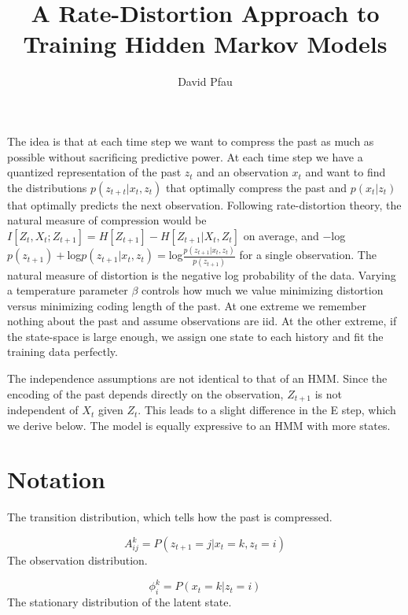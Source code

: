 \documentclass[11pt]{article}
\title{A Rate-Distortion Approach to Training Hidden Markov Models}
\author{David Pfau}
\begin{document}
\maketitle

The idea is that at each time step we want to compress the past as much as possible without sacrificing predictive power.  At each time step we have a quantized representation of the past $z_t$ and an observation $x_t$ and want to find the distributions $p(z_{t+t}|x_t,z_t)$ that optimally compress the past and $p(x_t|z_t)$ that optimally predicts the next observation.  Following rate-distortion theory, the natural measure of compression would be $I[Z_t,X_t;Z_{t+1}] = H[Z_{t+1}] - H[Z_{t+1}|X_t,Z_t]$ on average, and $-$log$p(z_{t+1}) + $log$p(z_{t+1}|x_t,z_t) = $log$\frac{p(z_{t+1}|x_t,z_t)}{p(z_{t+1})}$ for a single observation.  The natural measure of distortion is the negative log probability of the data.  Varying a temperature parameter $\beta$ controls how much we value minimizing distortion versus minimizing coding length of the past.  At one extreme we remember nothing about the past and assume observations are iid.  At the other extreme, if the state-space is large enough, we assign one state to each history and fit the training data perfectly.

The independence assumptions are not identical to that of an HMM.  Since the encoding of the past depends directly on the observation, $Z_{t+1}$ is not independent of $X_t$ given $Z_t$.  This leads to a slight difference in the E step, which we derive below.  The model is equally expressive to an HMM with more states.

\section{Notation}

The transition distribution, which tells how the past is compressed.

\[
A^{k}_{ij} = P(z_{t+1} = j | x_t = k, z_t = i)
\]
The observation distribution.

\[
\phi^k_i = P(x_t = k | z_t = i)
\]
The stationary distribution of the latent state.
\end{document}
